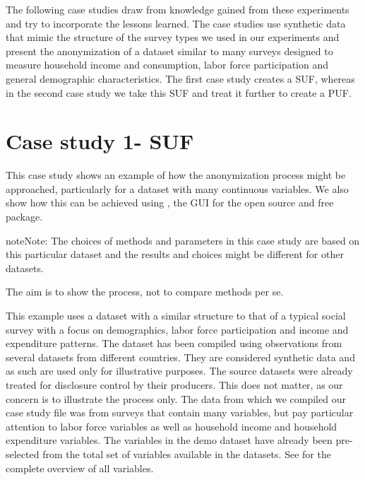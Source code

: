 \documentclass[letterpaper,10pt,english]{sphinxmanual}
\begin{document}
The following case studies draw from knowledge gained from these
experiments and try to incorporate the lessons learned. The case studies
use synthetic data that mimic the structure of the survey types we used
in our experiments and present the anonymization of a dataset similar to
many surveys designed to measure household income and consumption, labor
force participation and general demographic characteristics. The first
case study creates a SUF, whereas in the second case study we take this
SUF and treat it further to create a PUF.


\section{Case study 1- SUF}
\label{\detokenize{casestudies:case-study-1-suf}}
This case study shows an example of how the anonymization process might
be approached, particularly for a dataset with many continuous
variables. We also show how this can be achieved using , the GUI for
the open source and free   package.

\begin{sphinxadmonition}{note}{Note:}
The choices of methods and parameters in
this case study are based on this particular dataset and the results and
choices might be different for other datasets.
\end{sphinxadmonition}

The aim is to show the process, not to compare methods per se.

This example uses a dataset with a similar structure to that of a
typical social survey with a focus on demographics, labor force
participation and income and expenditure patterns. The dataset has been
compiled using observations from several datasets from different
countries. They are considered synthetic data and as such are used only
for illustrative purposes. The source datasets were already treated for
disclosure control by their producers. This does not matter, as our
concern is to illustrate the process only. The data from which we
compiled our case study file was from surveys that contain many
variables, but pay particular attention to labor force variables as well
as household income and household expenditure variables. The variables
in the demo dataset have already been pre-selected from the total set of
variables available in the datasets. See
for the complete overview of all variables.
\end{document}
